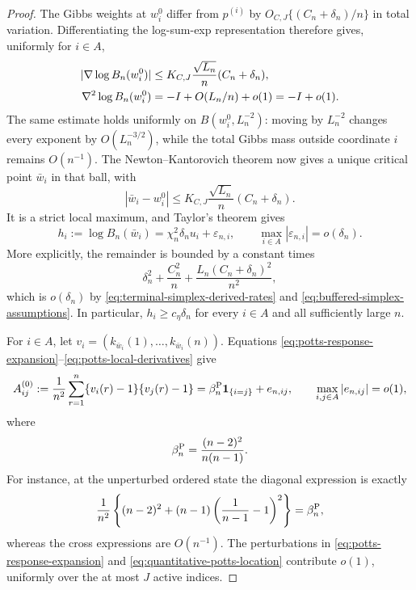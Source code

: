 \begin{proof}
The Gibbs weights at \(w_i^0\) differ from \(p^{(i)}\) by
\(O_{C,J}\{(C_n+\delta_n)/n\}\) in total variation.  Differentiating the
log-sum-exp representation therefore gives, uniformly for \(i\in A\),
\begin{align}
\label{eq:potts-local-derivatives}
 |\nabla\log B_n(w_i^0)|
 &\le K_{C,J}\frac{\sqrt{L_n}}n(C_n+\delta_n),\notag\\
 \nabla^2\log B_n(w_i^0)
 &=-I+O(L_n/n)+o(1)=-I+o(1).
\end{align}
The same estimate holds uniformly on \(B(w_i^0,L_n^{-2})\): moving by
\(L_n^{-2}\) changes every exponent by \(O(L_n^{-3/2})\), while the total
Gibbs mass outside coordinate \(i\) remains \(O(n^{-1})\).  The
Newton--Kantorovich theorem now gives a unique critical point \(\bar w_i\)
in that ball, with
\begin{equation}
\label{eq:quantitative-potts-location}
 |\bar w_i-w_i^0|
 \le K_{C,J}\frac{\sqrt{L_n}}n(C_n+\delta_n).
\end{equation}
It is a strict local maximum, and Taylor's theorem gives
\begin{equation}
\label{eq:potts-corrected-height}
 h_i:=\log B_n(\bar w_i)
 =\chi_n^2\delta_nu_i+\varepsilon_{n,i},
 \qquad
 \max_{i\in A}|\varepsilon_{n,i}|=o(\delta_n).
\end{equation}
More explicitly, the remainder is bounded by a constant times
\[
 \delta_n^2+\frac{C_n^2}{n}
 +\frac{L_n(C_n+\delta_n)^2}{n^2},
\]
which is \(o(\delta_n)\) by
\eqref{eq:terminal-simplex-derived-rates} and
\eqref{eq:buffered-simplex-assumptions}.  In particular,
\(h_i\ge c_\eta\delta_n\) for every \(i\in A\) and all sufficiently large
\(n\).

For \(i\in A\), let
\(v_i=(k_{\bar w_i}(1),\ldots,k_{\bar w_i}(n))\).  Equations
\eqref{eq:potts-response-expansion}--\eqref{eq:potts-local-derivatives}
give
\begin{equation}
\label{eq:potts-response-gram}
 A_{ij}^{(0)}
 :=\frac1{n^2}\sum_{r=1}^n\{v_i(r)-1\}\{v_j(r)-1\}
 =\beta_n^{\rm P}\mathbf1_{\{i=j\}}+e_{n,ij},
 \qquad
 \max_{i,j\in A}|e_{n,ij}|=o(1),
\end{equation}
where
\[
 \beta_n^{\rm P}=\frac{(n-2)^2}{n(n-1)}.
\]
For instance, at the unperturbed ordered state the diagonal expression is
exactly
\[
 \frac1{n^2}\left\{(n-2)^2
 +(n-1)\left(\frac1{n-1}-1\right)^2\right\}=\beta_n^{\rm P},
\]
whereas the cross expressions are \(O(n^{-1})\).  The perturbations in
\eqref{eq:potts-response-expansion} and
\eqref{eq:quantitative-potts-location} contribute \(o(1)\), uniformly over
the at most \(J\) active indices.


\end{proof}
